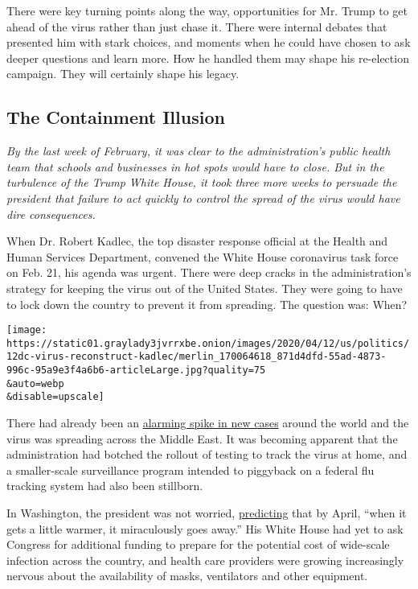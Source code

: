 There were key turning points along the way, opportunities for Mr. Trump
to get ahead of the virus rather than just chase it. There were internal
debates that presented him with stark choices, and moments when he could
have chosen to ask deeper questions and learn more. How he handled them
may shape his re-election campaign. They will certainly shape his
legacy.

\hypertarget{the-containment-illusion}{%
\subsection{The Containment Illusion}\label{the-containment-illusion}}

\emph{By the last week of February, it was clear to the administration's
public health team that schools and businesses in hot spots would have
to close. But in the turbulence of the Trump White House, it took three
more weeks to persuade the president that failure to act quickly to
control the spread of the virus would have dire consequences.}

When Dr. Robert Kadlec, the top disaster response official at the Health
and Human Services Department, convened the White House coronavirus task
force on Feb. 21, his agenda was urgent. There were deep cracks in the
administration's strategy for keeping the virus out of the United
States. They were going to have to lock down the country to prevent it
from spreading. The question was: When?

\texttt{[image: https://static01.graylady3jvrrxbe.onion/images/2020/04/12/us/politics/12dc-virus-reconstruct-kadlec/merlin\_170064618\_871d4dfd-55ad-4873-996c-95a9e3f4a6b6-articleLarge.jpg?quality=75\\\&auto=webp\\\&disable=upscale]}

There had already been an
\href{https://www.nytimes3xbfgragh.onion/2020/02/21/world/asia/china-coronavirus-iran.html}{alarming
spike in new cases} around the world and the virus was spreading across
the Middle East. It was becoming apparent that the administration had
botched the rollout of testing to track the virus at home, and a
smaller-scale surveillance program intended to piggyback on a federal
flu tracking system had also been stillborn.

In Washington, the president was not worried,
\href{https://factba.se/transcript/donald-trump-speech-kag-rally-manchester-new-hampshire-february-10-2020}{predicting}
that by April, ``when it gets a little warmer, it miraculously goes
away.'' His White House had yet to ask Congress for additional funding
to prepare for the potential cost of wide-scale infection across the
country, and health care providers were growing increasingly nervous
about the availability of masks, ventilators and other equipment.

